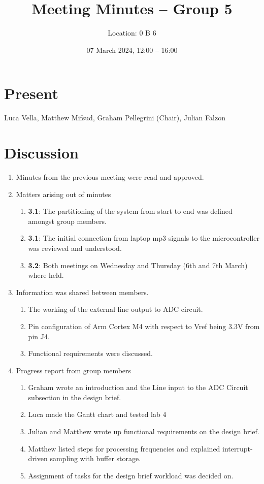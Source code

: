 \documentclass{cce2014-meetings}
\title{Meeting Minutes -- Group 5}
\author{Location: 0 B 6}
\date{07 March 2024, 12:00 -- 16:00}
\begin{document}
\maketitle

\section*{Present}
Luca Vella,
Matthew Mifsud,
Graham Pellegrini (Chair),
Julian Falzon

\section*{Discussion}

\begin{enumerate}


\item Minutes from the previous meeting were read and approved.

\item Matters arising out of minutes
   \begin{enumerate}
   \item \textbf{3.1}: The partitioning of the system from start to end was defined amongst group members.
   \item \textbf{3.1}: The initial connection from laptop mp3 signals to the microcontroller was reviewed and understood.
   \item \textbf{3.2}: Both meetings on Wednesday and Thursday (6th and 7th March) where held.
   \end{enumerate}

\item Information was shared between members.
   \begin{enumerate}
   \item The working of the external line output to ADC circuit.
   \item Pin configuration of Arm Cortex M4 with respect to Vref being 3.3V from pin J4.
   \item Functional requirements were discussed.
   \end{enumerate}

\item Progress report from group members
   \begin{enumerate}
   \item Graham wrote an introduction and the Line input to the ADC Circuit subsection in the design brief.
   \item Luca made the Gantt chart and tested lab 4
   \item Julian and Matthew wrote up functional requirements on the design brief.
   \item Matthew listed steps for processing frequencies and explained interrupt-driven sampling with buffer storage. 
   \item Assignment of tasks for the design brief workload was decided on.
   \end{enumerate}


\end{enumerate}
\end{document}
